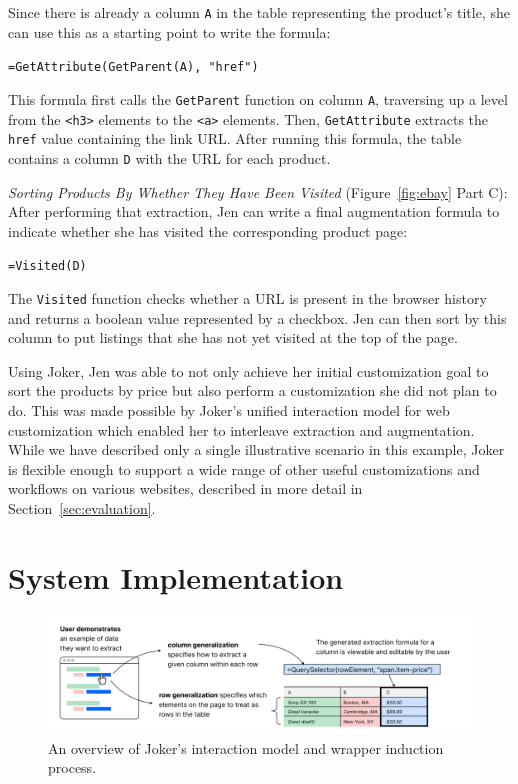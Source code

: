 \documentclass[conference]{IEEEtran}
\begin{document}
Since there is already a column \texttt{A} in the table representing the
product's title, she can use this as a starting point to write the
formula:

\texttt{=GetAttribute(GetParent(A),\ "href")}

This formula first calls the \texttt{GetParent} function on column
\texttt{A}, traversing up a level from the
\texttt{\textless{}h3\textgreater{}} elements to the
\texttt{\textless{}a\textgreater{}} elements. Then,
\texttt{GetAttribute} extracts the \texttt{href} value containing the
link URL. After running this formula, the table contains a column
\texttt{D} with the URL for each product.

\emph{Sorting Products By Whether They Have Been Visited}
(Figure~\ref{fig:ebay} Part C): After performing that extraction, Jen
can write a final augmentation formula to indicate whether she has
visited the corresponding product page:

\texttt{=Visited(D)}

The \texttt{Visited} function checks whether a URL is present in the
browser history and returns a boolean value represented by a checkbox.
Jen can then sort by this column to put listings that she has not yet
visited at the top of the page.

Using Joker, Jen was able to not only achieve her initial customization
goal to sort the products by price but also perform a customization she
did not plan to do. This was made possible by Joker's unified
interaction model for web customization which enabled her to interleave
extraction and augmentation. While we have described only a single
illustrative scenario in this example, Joker is flexible enough to
support a wide range of other useful customizations and workflows on
various websites, described in more detail in
Section~\ref{sec:evaluation}.

\hypertarget{sec:implementation}{%
\section{System Implementation}\label{sec:implementation}}

\begin{figure}
  \includegraphics[width=\textwidth]{media/overview.png}
  \caption{\label{fig:overview}An overview of Joker's interaction model and wrapper induction process.}
\end{figure}
\end{document}
